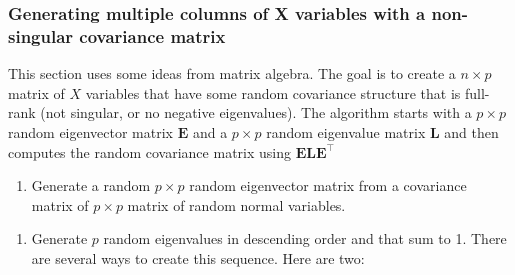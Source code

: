 \documentclass[]{book}
\newenvironment{Shaded}{\begin{snugshade}}{\end{snugshade}}
\newcommand{\KeywordTok}[1]{\textcolor[rgb]{0.13,0.29,0.53}{\textbf{#1}}}
\newcommand{\StringTok}[1]{\textcolor[rgb]{0.31,0.60,0.02}{#1}}
\newcommand{\CommentTok}[1]{\textcolor[rgb]{0.56,0.35,0.01}{\textit{#1}}}
\newcommand{\ControlFlowTok}[1]{\textcolor[rgb]{0.13,0.29,0.53}{\textbf{#1}}}
\newcommand{\OperatorTok}[1]{\textcolor[rgb]{0.81,0.36,0.00}{\textbf{#1}}}
\newcommand{\NormalTok}[1]{#1}
\providecommand{\tightlist}{%
  \setlength{\itemsep}{0pt}\setlength{\parskip}{0pt}}
\begin{document}
\subsubsection{Generating multiple columns of X variables with a
non-singular covariance
matrix}\label{generating-multiple-columns-of-x-variables-with-a-non-singular-covariance-matrix}

This section uses some ideas from matrix algebra. The goal is to create
a \(n \times p\) matrix of \(X\) variables that have some random
covariance structure that is full-rank (not singular, or no negative
eigenvalues). The algorithm starts with a \(p \times p\) random
eigenvector matrix \(\mathbf{E}\) and a \(p \times p\) random eigenvalue
matrix \(\mathbf{L}\) and then computes the random covariance matrix
using \(\mathbf{E}\mathbf{L}\mathbf{E}^\top\)

\begin{enumerate}
\def\labelenumi{\arabic{enumi}.}
\tightlist
\item
  Generate a random \(p \times p\) random eigenvector matrix from a
  covariance matrix of \(p \times p\) matrix of random normal variables.
\end{enumerate}

\begin{Shaded}
\end{Shaded}

\begin{enumerate}
\def\labelenumi{\arabic{enumi}.}
\setcounter{enumi}{1}
\tightlist
\item
  Generate \(p\) random eigenvalues in descending order and that sum to
  1. There are several ways to create this sequence. Here are two:
\end{enumerate}
\end{document}
